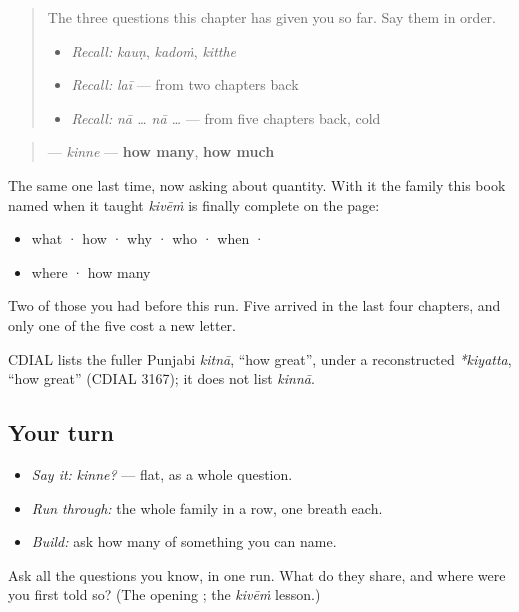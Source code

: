 \label{lesson:PA-C43-kinne}



\begin{quote}
The three questions this chapter has given you so far. Say them in order.

\begin{itemize}
\raggedright
  \item \emph{Recall:} \emph{kauṇ}, \emph{kadoṁ}, \emph{kitthe}
  \item \emph{Recall:} \emph{laī} — from two chapters back
  \item \emph{Recall:} \emph{nā … nā …} — from five chapters back, cold
\end{itemize}
\end{quote}

\begin{cousinweb}
\begin{quote}
\textbf{} — \emph{kinne} — \textbf{how many}, \textbf{how much}
\end{quote}

The same \textbf{} one last time, now asking about quantity. With it the family this book named when it taught \emph{kivēṁ} is finally complete on the page:

\begin{itemize}
\raggedright
  \item \textbf{} what · \textbf{} how · \textbf{} why · \textbf{} who · \textbf{} when ·
  \item \textbf{} where · \textbf{} how many
\end{itemize}

Two of those you had before this run. Five arrived in the last four chapters, and only one of the five cost a new letter.

CDIAL lists the fuller Punjabi \emph{kitnā}, \textquotedblleft{}how great\textquotedblright{}, under a reconstructed \emph{*kiyatta}, \textquotedblleft{}how great\textquotedblright{} (CDIAL 3167); it does not list \emph{kinnā}.
\end{cousinweb}

\subsection*{Your turn}
\begin{itemize}
\raggedright
  \item \emph{Say it:} \emph{kinne?} — flat, as a whole question.
  \item \emph{Run through:} the whole family in a row, one breath each.
  \item \emph{Build:} ask how many of something you can name.
\end{itemize}

\begin{tcolorbox}[breakable,colback=teal!4,colframe=teal!35!black,title={Before you move on}]
Ask all the questions you know, in one run. What do they share, and where were you first told so? (The opening \textbf{}; the \emph{kivēṁ} lesson.)
\end{tcolorbox}
